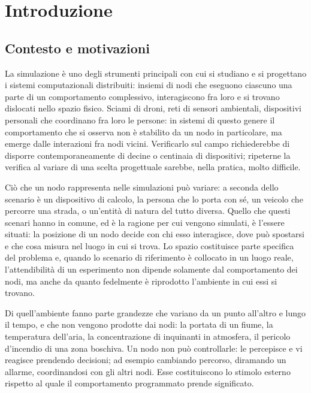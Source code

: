 \chapter{Introduzione}
\label{cap:introduzione}

\section{Contesto e motivazioni}
\label{sec:contesto-e-motivazioni}

La simulazione è uno degli strumenti principali con cui si studiano e si progettano
i sistemi computazionali distribuiti: insiemi di nodi che eseguono ciascuno una parte
di un comportamento complessivo, interagiscono fra loro e si trovano dislocati
nello spazio fisico. Sciami di droni, reti di sensori ambientali,
dispositivi personali che coordinano fra loro le persone: in sistemi di questo
genere il comportamento che si osserva non è stabilito da un nodo in particolare,
ma emerge dalle interazioni fra nodi vicini. Verificarlo sul campo richiederebbe di
disporre contemporaneamente di decine o centinaia di dispositivi; ripeterne la verifica
al variare di una scelta progettuale sarebbe, nella pratica, molto difficile.

Ciò che un nodo rappresenta nelle simulazioni può variare: a seconda dello scenario
è un dispositivo di calcolo, la persona che lo porta con sé, un veicolo che percorre
una strada, o un'entità di natura del tutto diversa. Quello che questi scenari hanno
in comune, ed è la ragione per cui vengono simulati, è l'essere situati: la posizione
di un nodo decide con chi esso interagisce, dove può spostarsi e che cosa misura
nel luogo in cui si trova. Lo spazio costituisce parte specifica del problema e,
quando lo scenario di riferimento è collocato in un luogo reale, l'attendibilità di un
esperimento non dipende solamente dal comportamento dei nodi, ma anche da quanto
fedelmente è riprodotto l'ambiente in cui essi si trovano.

Di quell'ambiente fanno parte grandezze che variano da un punto all'altro e lungo
il tempo, e che non vengono prodotte dai nodi: la portata di un fiume,
la temperatura dell'aria, la concentrazione di inquinanti in atmosfera, il pericolo
d'incendio di una zona boschiva. Un nodo non può controllarle: le percepisce e vi
reagisce prendendo decisioni; ad esempio cambiando percorso, diramando un allarme, coordinandosi
con gli altri nodi. Esse costituiscono lo stimolo esterno rispetto al quale
il comportamento programmato prende significato.

